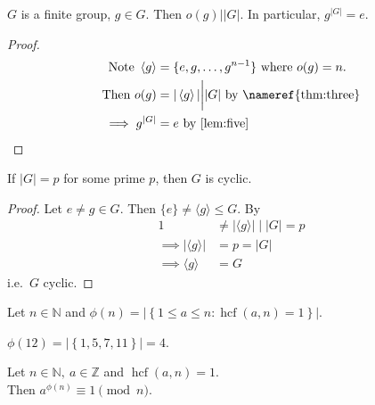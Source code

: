 \begin{corollary}
\protect\hypertarget{cor:two}{}\label{cor:two}
\(G\) is a finite group, \(g \in G\).
Then \(o(g) \bigg| |G|\).
In particular, \(g^{|G|} = e\).
\end{corollary}

\begin{proof}
\begin{align*}
    \text{Note } \left\langle g\right\rangle &= \{ e, g, \ldots, g^{n-1} \} \text{ where } o(g) = n. \\
    \text{Then } o(g) &= | \left\langle g\right\rangle | \bigg| |G| \text{ by \nameref{thm:three}} \\
    \implies g^{|G|} &= e \text{ by \Cref{lem:five}}
\end{align*}
\end{proof}

\begin{corollary}
\protect\hypertarget{cor:three}{}\label{cor:three}
If \(|G| = p\) for some prime \(p\), then \(G\) is cyclic.
\end{corollary}

\begin{proof}
Let \(e \neq g \in G\).
Then \(\{ e \} \neq \langle g \rangle \leq G\).
By 
\begin{align*}
    1 &\neq | \langle g \rangle | \;\bigg|\; |G| = p \\
    \implies | \langle g \rangle | &= p = |G| \\
    \implies \langle g \rangle &= G
\end{align*}
i.e.~\(G\) cyclic.
\end{proof}

\begin{definition}
    Let \(n \in \mathbb{N}\) and \(\phi(n) = \left| \left\{ 1 \leq a \leq n : \operatorname{hcf}(a, n) = 1 \right\} \right|\). 
\end{definition} 

\begin{example}
    \(\phi(12) = \left| \left\{ 1, 5, 7, 11 \right\} \right| = 4\).
\end{example} 

\begin{theorem}
\protect\hypertarget{thm:four}{}\label{thm:four}Let \(n \in \mathbb{N},\ a \in \mathbb{Z}\) and \(\operatorname{hcf}(a, n) = 1\).\\
Then \(a^{\phi(n)} \equiv 1 \pmod n\).
\end{theorem}

